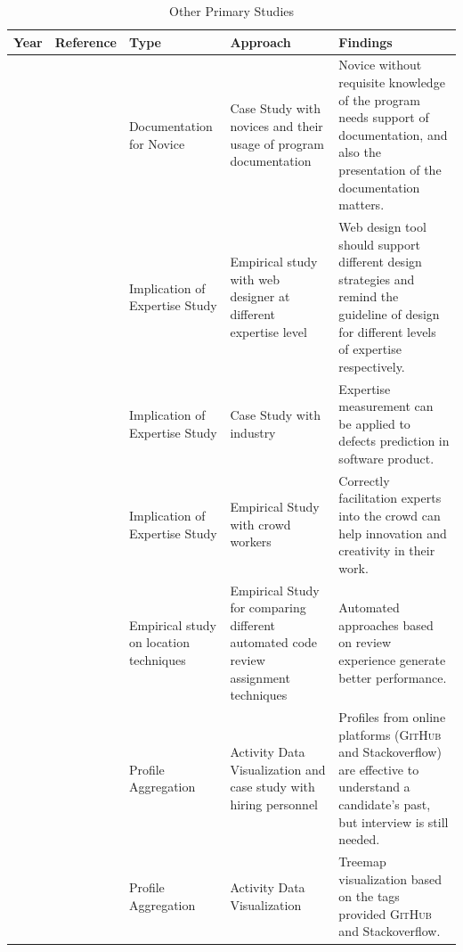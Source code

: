 \begin{table}[htbp]
\centering
\footnotesize
\settowidth{}
\begin{tabulary}{\textwidth}{LLLLL}
\hline
\textbf{Year}           & \textbf{Reference}          & \textbf{Type}     &\textbf{Approach}  & \textbf{Findings}\\ \hline
\citeyear{pinto1988providing} & \citeauthor{pinto1988providing}\cite{pinto1988providing} & Documentation for Novice & Case Study with novices and their usage of program documentation & Novice without requisite knowledge of the program needs support of documentation, and also the presentation of the documentation matters.\\\hline
\citeyear{chevalier2003web} & \citeauthor{chevalier2003web}\cite{chevalier2003web} & Implication of Expertise Study & Empirical study with web designer at different expertise level & Web design tool should support different design strategies and remind the guideline of design for different levels of expertise respectively. \\\hline
\citeyear{klas2010transparent} & \citeauthor{klas2010transparent}\cite{klas2010transparent} & Implication of Expertise Study & Case Study with industry &  Expertise measurement can be applied to defects prediction in software product. \\\hline
\citeyear{chan2016improving} & \citeauthor{chan2016improving}\cite{chan2016improving} & Implication of Expertise Study & Empirical Study with crowd workers & Correctly facilitation experts into the crowd can help innovation and creativity in their work.\\\hline
\citeyear{hannebauer2016automatically} & \citeauthor{hannebauer2016automatically}\cite{hannebauer2016automatically} & Empirical study on location techniques & Empirical Study for comparing different automated code review assignment techniques & Automated approaches based on review experience generate better performance. \\\hline
\citeyear{hiring2016sarma} & \citeauthor{hiring2016sarma}\cite{hiring2016sarma} & Profile Aggregation & Activity Data Visualization and case study with hiring personnel & Profiles from online platforms (\textsc{GitHub} and Stackoverflow) are effective to understand a candidate's past, but interview is still needed. \\\hline
\citeyear{saxena2017know} & \citeauthor{saxena2017know}\cite{saxena2017know} & Profile Aggregation & Activity Data Visualization & Treemap visualization based on the tags provided \textsc{GitHub} and Stackoverflow. \\\hline
\end{tabulary}
\caption{Other Primary Studies}
\label{tab:other}
\end{table}

